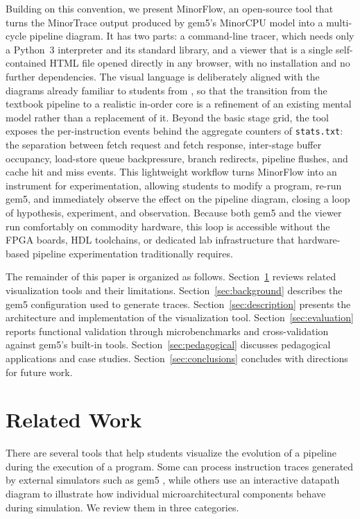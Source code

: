 \documentclass{ceurart}
\begin{document}
Building on this convention, we present MinorFlow, an open-source tool that turns the MinorTrace output produced by gem5's MinorCPU model into a multi-cycle pipeline diagram. It has two parts: a command-line tracer, which needs only a Python~3 interpreter and its standard library, and a viewer that is a single self-contained HTML file opened directly in any browser, with no installation and no further dependencies. The visual language is deliberately aligned with the diagrams already familiar to students from \cite{patterson2020computer}, so that the transition from the textbook pipeline to a realistic in-order core is a refinement of an existing mental model rather than a replacement of it. Beyond the basic stage grid, the tool exposes the per-instruction events behind the aggregate counters of \texttt{stats.txt}: the separation between fetch request and fetch response, inter-stage buffer occupancy, load-store queue backpressure, branch redirects, pipeline flushes, and cache hit and miss events. This lightweight workflow turns MinorFlow into an instrument for experimentation, allowing students to modify a program, re-run gem5, and immediately observe the effect on the pipeline diagram, closing a loop of hypothesis, experiment, and observation. Because both gem5 and the viewer run comfortably on commodity hardware, this loop is accessible without the FPGA boards, HDL toolchains, or dedicated lab infrastructure that hardware-based pipeline experimentation traditionally requires.

The remainder of this paper is organized as follows. Section~\ref{sec:related} reviews related visualization tools and their limitations. Section~\ref{sec:background} describes the gem5 configuration used to generate traces. Section~\ref{sec:description} presents the architecture and implementation of the visualization tool. Section~\ref{sec:evaluation} reports functional validation through microbenchmarks and cross-validation against gem5’s built-in tools. Section~\ref{sec:pedagogical} discusses pedagogical applications and case studies. Section~\ref{sec:conclusions} concludes with directions for future work.

\section{Related Work}
\label{sec:related}

There are several tools that help students visualize the evolution of a pipeline during the execution of a program. Some can process instruction traces generated by external simulators such as gem5 \cite{binkert2011gem5}, while others use an interactive datapath diagram to illustrate how individual microarchitectural components behave during simulation. We review them in three categories.
\end{document}
